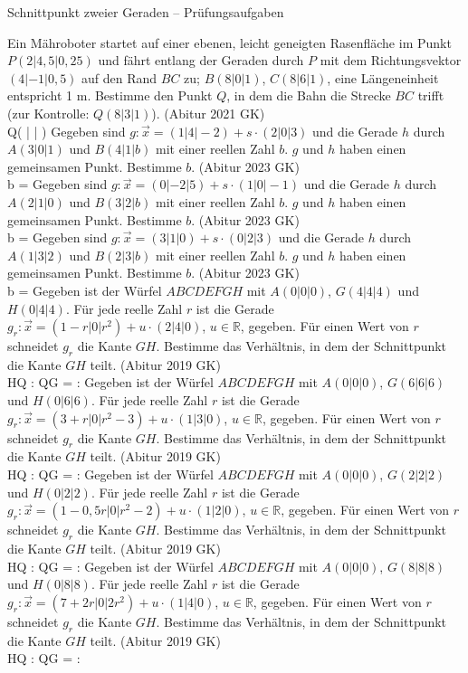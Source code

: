 \begin{aufgabe}{Schnittpunkt zweier Geraden – Prüfungsaufgaben}
\begin{teile}
\teil Ein Mähroboter startet auf einer ebenen, leicht geneigten Rasenfläche im Punkt $P(2|4{,}5|0{,}25)$ und fährt entlang der Geraden durch $P$ mit dem Richtungsvektor $(4|-1|0{,}5)$ auf den Rand $BC$ zu; $B(8|0|1)$, $C(8|6|1)$, eine Längeneinheit entspricht 1 m. Bestimme den Punkt $Q$, in dem die Bahn die Strecke $BC$ trifft (zur Kontrolle: $Q(8|3|1)$). \hfill (Abitur 2021 GK) \\ Q( \leerfeld | \leerfeld | \leerfeld )
\teil Gegeben sind $g: \vec{x} = (1|4|-2) + s \cdot (2|0|3)$ und die Gerade $h$ durch $A(3|0|1)$ und $B(4|1|b)$ mit einer reellen Zahl $b$. $g$ und $h$ haben einen gemeinsamen Punkt. Bestimme $b$. \hfill (Abitur 2023 GK) \\ b = \leerfeld
\teil Gegeben sind $g: \vec{x} = (0|-2|5) + s \cdot (1|0|-1)$ und die Gerade $h$ durch $A(2|1|0)$ und $B(3|2|b)$ mit einer reellen Zahl $b$. $g$ und $h$ haben einen gemeinsamen Punkt. Bestimme $b$. \hfill (Abitur 2023 GK) \\ b = \leerfeld
\teil Gegeben sind $g: \vec{x} = (3|1|0) + s \cdot (0|2|3)$ und die Gerade $h$ durch $A(1|3|2)$ und $B(2|3|b)$ mit einer reellen Zahl $b$. $g$ und $h$ haben einen gemeinsamen Punkt. Bestimme $b$. \hfill (Abitur 2023 GK) \\ b = \leerfeld
\teil Gegeben ist der Würfel $ABCDEFGH$ mit $A(0|0|0)$, $G(4|4|4)$ und $H(0|4|4)$. Für jede reelle Zahl $r$ ist die Gerade $g_r: \vec{x} = (1 - r|0|r^2) + u \cdot (2|4|0)$, $u \in \mathbb{R}$, gegeben. Für einen Wert von $r$ schneidet $g_r$ die Kante $GH$. Bestimme das Verhältnis, in dem der Schnittpunkt die Kante $GH$ teilt. \hfill (Abitur 2019 GK) \\ HQ : QG = \leerfeld : \leerfeld
\teil Gegeben ist der Würfel $ABCDEFGH$ mit $A(0|0|0)$, $G(6|6|6)$ und $H(0|6|6)$. Für jede reelle Zahl $r$ ist die Gerade $g_r: \vec{x} = (3 + r|0|r^2 - 3) + u \cdot (1|3|0)$, $u \in \mathbb{R}$, gegeben. Für einen Wert von $r$ schneidet $g_r$ die Kante $GH$. Bestimme das Verhältnis, in dem der Schnittpunkt die Kante $GH$ teilt. \hfill (Abitur 2019 GK) \\ HQ : QG = \leerfeld : \leerfeld
\teil Gegeben ist der Würfel $ABCDEFGH$ mit $A(0|0|0)$, $G(2|2|2)$ und $H(0|2|2)$. Für jede reelle Zahl $r$ ist die Gerade $g_r: \vec{x} = (1 - 0{,}5r|0|r^2 - 2) + u \cdot (1|2|0)$, $u \in \mathbb{R}$, gegeben. Für einen Wert von $r$ schneidet $g_r$ die Kante $GH$. Bestimme das Verhältnis, in dem der Schnittpunkt die Kante $GH$ teilt. \hfill (Abitur 2019 GK) \\ HQ : QG = \leerfeld : \leerfeld
\teil Gegeben ist der Würfel $ABCDEFGH$ mit $A(0|0|0)$, $G(8|8|8)$ und $H(0|8|8)$. Für jede reelle Zahl $r$ ist die Gerade $g_r: \vec{x} = (7 + 2r|0|2r^2) + u \cdot (1|4|0)$, $u \in \mathbb{R}$, gegeben. Für einen Wert von $r$ schneidet $g_r$ die Kante $GH$. Bestimme das Verhältnis, in dem der Schnittpunkt die Kante $GH$ teilt. \hfill (Abitur 2019 GK) \\ HQ : QG = \leerfeld : \leerfeld
\end{teile}
\end{aufgabe}

